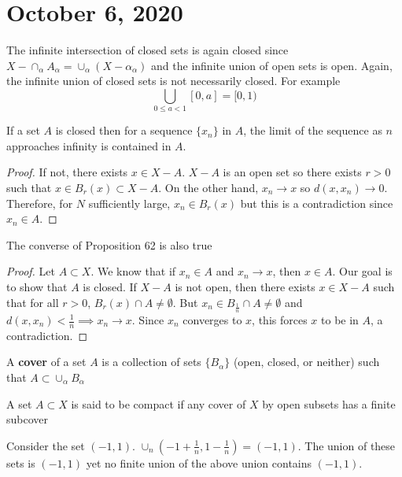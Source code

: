 \documentclass{article}
\newcommand{\vocab}[1]{\textbf{\color{blue!90}\boldmath #1}}
\newcommand{\ra}[1][]{\xrightarrow{#1}}
\begin{document}
\section{October 6, 2020}
\begin{proposition}
The infinite intersection of closed sets is again closed since $X-\cap_\alpha A_\alpha=\cup_\alpha(X-\alpha_\alpha)$ and the infinite union of open sets is open. Again, the infinite union of closed sets is not necessarily closed. For example $$\bigcup_{0\leq a <1} [0,a]=[0,1)$$
\end{proposition}
\begin{proposition}
If a set $A$ is closed then for a sequence $\{x_n\}$ in $A$, the limit of the sequence as $n$ approaches infinity is contained in $A$.
\end{proposition}
\begin{proof}
If not, there exists $x\in X-A$. $X-A$ is an open set so there exists $r>0$ such that $x\in B_r(x)\subset X-A$. On the other hand, $x_n\ra x$ so $d(x,x_n)\ra 0$. Therefore, for $N$ sufficiently large, $x_n\in B_r(x)$ but this is a contradiction since $x_n\in A$.
\end{proof}
\begin{proposition}
The converse of Proposition 62 is also true
\end{proposition}
\begin{proof}
Let $A\subset X$. We know that if $x_n\in A$ and $x_n\ra x$, then $x\in A$. Our goal is to show that $A$ is closed. If $X-A$ is not open, then there exists $x\in X-A$ such that for all $r>0$, $B_r(x)\cap A\neq\emptyset$. But $x_n\in B_{\frac{1}{n}}\cap A\neq \emptyset$ and $d(x,x_n)<\frac{1}{n}\implies x_n\ra x$. Since $x_n$ converges to $x$, this forces $x$ to be in $A$, a contradiction.
\end{proof}
\begin{definition}
A \vocab{cover} of a set $A$ is a collection of sets $\{B_\alpha\}$ (open, closed, or neither) such that $A\subset \cup_\alpha B_\alpha$
\end{definition}
\begin{definition}
A set $A\subset X$ is said to be compact if any cover of $X$ by open subsets has a finite subcover
\end{definition}
\begin{example}
Consider the set $(-1,1)$. $\cup_n(-1+\frac{1}{n},1-\frac{1}{n})=(-1,1)$. The union of these sets is $(-1,1)$ yet no finite union of the above union contains $(-1,1)$.
\end{example}
\end{document}
